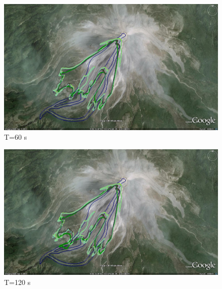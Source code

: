 \documentclass[letterpaper,10pt]{article}
\begin{document}
\begin{figure}[H]
\centerline{\includegraphics[width=.9\textwidth]{IMAGES/pics/comp12.jpg}}
\caption{T=60 s}
\label{comp12}
\end{figure}
\begin{figure}[H]
\centerline{\includegraphics[width=.9\textwidth]{IMAGES/pics/comp36.jpg}}
\caption{T=120 s}
\label{comp36}
\end{figure}

\end{document}
